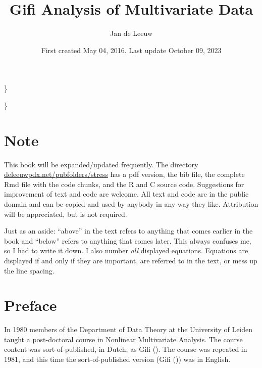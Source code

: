 \documentclass[
  12pt,
]{book}
\title{Gifi Analysis of Multivariate Data}
\author{Jan de Leeuw}
\date{First created May 04, 2016. Last update October 09, 2023}
\begin{document}
\maketitle

{
\setcounter{tocdepth}{3}
\tableofcontents
}
\newcommand{\ul}[1]{\underline{#1}}
\newcommand{\ol}[1]{\overline{#1}}
\newcommand{\bb}[1]{\mathbb{#1}}
\newcommand{\mc}[1]{\mathcal{#1}}
\newcommand{\df}{=:}
\newcommand{\am}[1]{\mathop{\text{argmin}}_{#1}}

\}

\newcommand{\ls}[2]{\mathop{\sum\sum}_{#1}^{#2}}

\}
\newcommand{\ijs}{\mathop{\sum\sum}_{1\leq i<j\leq n}}
\newcommand{\jis}{\mathop{\sum\sum}_{1\leq j<i\leq n}}
\newcommand{\sij}{\sum_{i=1}^n\sum_{j=1}^n}

\newcommand{\argmin}[1]{\mathop{\mathbf{argmin}}\limits_{#1}}
\newcommand{\argmax}[1]{\mathop{\mathbf{argmax}}\limits_{#1}}

\chapter*{Note}\label{note}

This book will be expanded/updated frequently. The directory \href{http://deleeuwpdx.net/pubfolders/stress}{deleeuwpdx.net/pubfolders/stress} has a pdf version, the bib file, the complete Rmd file with the code chunks, and the R and C source code. Suggestions for improvement of text and code are welcome. All text and code are in the public domain and can be copied and used by anybody in any way they like. Attribution will be appreciated, but is not required.

Just as an aside: ``above'' in the text refers to anything that comes earlier in the book and ``below'' refers to anything that comes later. This always confuses me, so I had to write it down. I also number \emph{all} displayed equations. Equations are displayed if and only if they are important, are referred to in the text, or mess up the line spacing.

\chapter*{Preface}\label{preface}

In 1980 members of the Department of Data Theory at the University of Leiden taught a post-doctoral course in Nonlinear Multivariate Analysis. The course content was sort-of-published, in Dutch, as Gifi (). The course was repeated in 1981, and this time the sort-of-published version (Gifi ()) was in English.
\end{document}
